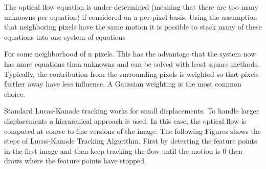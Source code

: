 The optical flow equation is under-determined (meaning that there are too many unknowns per equation) if considered on a per-pixel basis. Using the assumption that neighboring pixels have the same motion it is possible to stack many of these equations into one system of equations\bigskip

For some neighborhood of n pixels. This has the advantage that the system now has more equations than unknowns and can be solved with least square methods. Typically, the contribution from the surrounding pixels is weighted so that pixels farther away have less influence. A Gaussian weighting is the most common choice.\bigskip

Standard Lucas-Kanade tracking works for small displacements. To handle larger displacements a hierarchical approach is used. In this case, the optical flow is computed at coarse to fine versions of the image. The following Figures shows the steps of Lucas-Kanade Tracking Algorithm. First by detecting the feature points in the first image and then keep tracking the flow until the motion is 0 then draws where the feature points have stopped. \bigskip

\begin{figure}[h]
\begin{dBox}
\centering
  \mbox{
   }
   \caption{\label{fig:dynamic121314} }   
\end{dBox}   
\end{figure}

